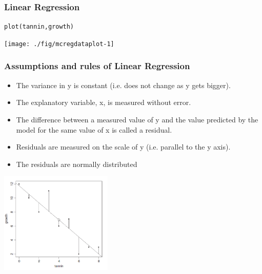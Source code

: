 \documentclass[xcolor=table, xcolor=dvipsnames]{beamer}\usepackage[]{graphicx}\usepackage[]{color}
\makeatletter
\newcommand{\hlstd}[1]{\textcolor[rgb]{0,0,0}{#1}}
\newcommand{\hlkwd}[1]{\textcolor[rgb]{0,0,1}{#1}}
\newenvironment{kframe}{%
 \def\at@end@of@kframe{}%
 \ifinner\ifhmode%
  \def\at@end@of@kframe{\end{minipage}}%
  \begin{minipage}{\columnwidth}%
 \fi\fi%
 \def\FrameCommand##1{\hskip\@totalleftmargin \hskip-\fboxsep
 \colorbox{shadecolor}{##1}\hskip-\fboxsep
     \hskip-\linewidth \hskip-\@totalleftmargin \hskip\columnwidth}%
 \MakeFramed {\advance\hsize-\width
   \@totalleftmargin\z@ \linewidth\hsize
   \@setminipage}}%
 {\par\unskip\endMakeFramed%
 \at@end@of@kframe}
\newenvironment{knitrout}{}{} %
\makeatother
\begin{document}

\begin{frame}[fragile]\frametitle{Linear Regression}
\begin{knitrout}
\color{fgcolor}\begin{kframe}
\begin{alltt}
\hlkwd{plot}\hlstd{(tannin, growth)}
\end{alltt}
\end{kframe}

{\centering \texttt{[image: ./fig/mcregdataplot-1]} 

}



\end{knitrout}
\end{frame}


\begin{frame}[fragile]\frametitle{Assumptions and rules of Linear Regression}
\begin{itemize}
\item The variance in y is constant (i.e. does not change as y gets bigger).
\item The explanatory variable, x, is measured without error.
\item The difference between a measured value of y and the value predicted by the model for
the same value of x is called a residual.
\item Residuals are measured on the scale of y (i.e. parallel to the y axis).
\item The residuals are normally distributed
\end{itemize}
\begin{center}
\includegraphics[width=0.4\textwidth]{./externalfig/tannin_residualsplot.png}
\end{center}
\end{frame}
\end{document}
